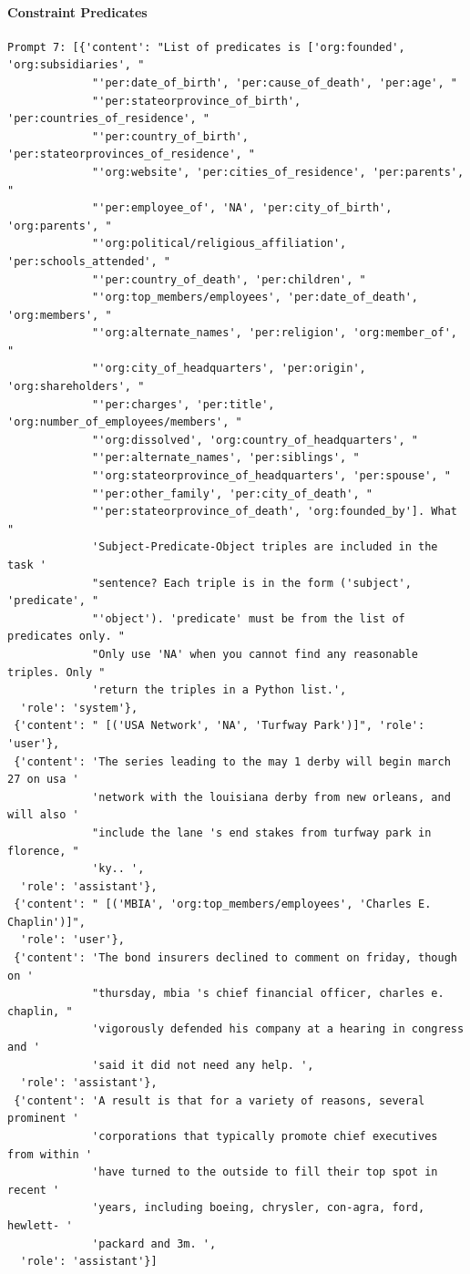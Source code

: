 \documentclass{article}
\begin{document}
\paragraph{Constraint Predicates}
\begin{lstlisting}
Prompt 7: [{'content': "List of predicates is ['org:founded', 'org:subsidiaries', "
             "'per:date_of_birth', 'per:cause_of_death', 'per:age', "
             "'per:stateorprovince_of_birth', 'per:countries_of_residence', "
             "'per:country_of_birth', 'per:stateorprovinces_of_residence', "
             "'org:website', 'per:cities_of_residence', 'per:parents', "
             "'per:employee_of', 'NA', 'per:city_of_birth', 'org:parents', "
             "'org:political/religious_affiliation', 'per:schools_attended', "
             "'per:country_of_death', 'per:children', "
             "'org:top_members/employees', 'per:date_of_death', 'org:members', "
             "'org:alternate_names', 'per:religion', 'org:member_of', "
             "'org:city_of_headquarters', 'per:origin', 'org:shareholders', "
             "'per:charges', 'per:title', 'org:number_of_employees/members', "
             "'org:dissolved', 'org:country_of_headquarters', "
             "'per:alternate_names', 'per:siblings', "
             "'org:stateorprovince_of_headquarters', 'per:spouse', "
             "'per:other_family', 'per:city_of_death', "
             "'per:stateorprovince_of_death', 'org:founded_by']. What "
             'Subject-Predicate-Object triples are included in the task '
             "sentence? Each triple is in the form ('subject', 'predicate', "
             "'object'). 'predicate' must be from the list of predicates only. "
             "Only use 'NA' when you cannot find any reasonable triples. Only "
             'return the triples in a Python list.',
  'role': 'system'},
 {'content': " [('USA Network', 'NA', 'Turfway Park')]", 'role': 'user'},
 {'content': 'The series leading to the may 1 derby will begin march 27 on usa '
             'network with the louisiana derby from new orleans, and will also '
             "include the lane 's end stakes from turfway park in florence, "
             'ky.. ',
  'role': 'assistant'},
 {'content': " [('MBIA', 'org:top_members/employees', 'Charles E. Chaplin')]",
  'role': 'user'},
 {'content': 'The bond insurers declined to comment on friday, though on '
             "thursday, mbia 's chief financial officer, charles e. chaplin, "
             'vigorously defended his company at a hearing in congress and '
             'said it did not need any help. ',
  'role': 'assistant'},
 {'content': 'A result is that for a variety of reasons, several prominent '
             'corporations that typically promote chief executives from within '
             'have turned to the outside to fill their top spot in recent '
             'years, including boeing, chrysler, con-agra, ford, hewlett- '
             'packard and 3m. ',
  'role': 'assistant'}]



\end{lstlisting}
\end{document}
